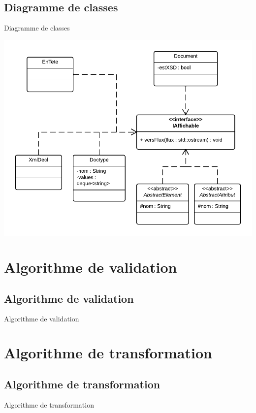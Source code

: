 \documentclass[aspectratio=169]{beamer}
\begin{document}
\subsection{Diagramme de classes}
\begin{frame}{Diagramme de classes}
\begin{center}
  \includegraphics[scale=0.3]{ddc_iaff}
\end{center}
\end{frame}


\section{Algorithme de  validation}
\subsection{Algorithme de  validation}
\begin{frame}{Algorithme de validation}
 
\end{frame}

\section{Algorithme de transformation}
\subsection{Algorithme de transformation}
\begin{frame}{Algorithme de transformation}
 
\end{frame}
\end{document}
